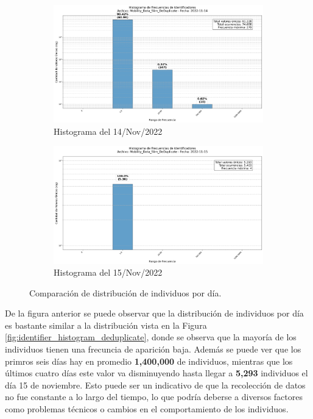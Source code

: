 \begin{figure}[H]
    \begin{subfigure}[t]{0.48\textwidth-1em}
        \includegraphics[width=\linewidth]{img/daily_histograms/histograma_identifier_Mobility_Data_Slim_DeDuplicate_2022-11-14.png}
        \caption{Histograma del 14/Nov/2022}
        \label{fig:sub9}
    \end{subfigure}
    \hfill
    \begin{subfigure}[t]{0.48\textwidth-1em}
        \includegraphics[width=\linewidth]{img/daily_histograms/histograma_identifier_Mobility_Data_Slim_DeDuplicate_2022-11-15.png}
        \caption{Histograma del 15/Nov/2022}
        \label{fig:sub10}
    \end{subfigure}
    \caption{Comparación de distribución de individuos por día.}
    \label{fig:histogramas_daily}
\end{figure}

De la figura anterior se puede observar que la distribución de individuos por día es bastante similar a la distribución vista en la Figura \ref{fig:identifier_histogram_deduplicate}, donde se observa que la mayoría de los individuos tienen una frecuncia de aparición baja. Además se puede ver que los primros seis días hay en promedio \textbf{1,400,000} de individuos, mientras que los últimos cuatro días este valor va disminuyendo hasta llegar a \textbf{5,293} individuos el día 15 de noviembre. Esto puede ser un indicativo de que la recolección de datos no fue constante a lo largo del tiempo, lo que podría deberse a diversos factores como problemas técnicos o cambios en el comportamiento de los individuos.

